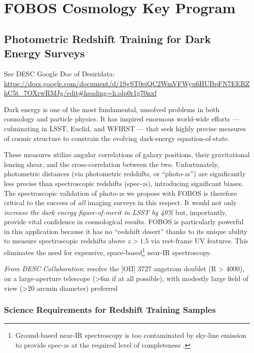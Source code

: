 \documentclass[preprint,11pt]{aastex}
\begin{document}
\section{FOBOS Cosmology Key Program} \label{sec:cosmology}

\subsection{Photometric Redshift Training for Dark Energy Surveys}
\label{sec:photoz}

See DESC Google Doc of Desiridata: \url{https://docs.google.com/document/d/1SgST0eiQC2WmVFWyu6HUBpFN7EERZhC5t\_7OXrwRMJg/edit\#heading=h.olp0r1g70nxf}

Dark energy is one of
the most fundamental, unsolved problems in both cosmology and particle
physics.  It has inspired enormous world-wide efforts --- culminating in
LSST, Euclid, and WFIRST --- that seek highly precise measures of cosmic
structure to constrain the evolving dark-energy equation-of-state.

These measures utilize angular correlations of galaxy positions, their
gravitational lensing shear, and the cross-correlation between the two.
Unfortunately, photometric distances (via photometric redshifts, or
``photo-$z$s'') are significantly less precise than spectroscopic
redshifts (spec-$z$s), introducing significant biases.  The
spectroscopic validation of photo-$z$s we propose with FOBOS is
therefore critical to the success of {\it all} imaging surveys in this
respect. It would not only \emph{increase the dark energy
figure-of-merit in LSST by 40\%} \citep{newman15} but, importantly,
provide vital confidence in cosmological results.  FOBOS is particularly
powerful in this application because it has no ``redshift desert'' thanks to its unique ability to measure spectroscopic redshifts above $z > 1.5$ via
rest-frame UV features.  This eliminates the need for expensive, space-based\footnote{Ground-based near-IR
spectroscopy is too contaminated by sky-line emission to provide spec-$z$s at the required level of completeness
\citep{newman15}.} near-IR spectroscopy.


\emph{From DESC Collaboration}: resolve the [OII] 3727 angstrom doublet (R > 4000), on a large-aperture telescope (>6m if at all possible), with modestly large field of view (>20 arcmin diameter) preferred


\subsubsection{Science Requirements for Redshift Training Samples}
\end{document}
